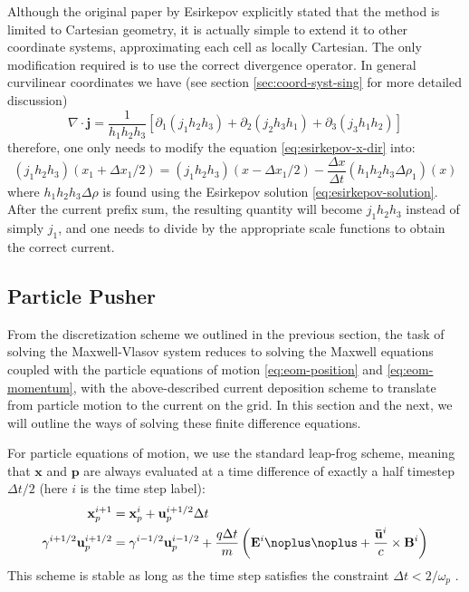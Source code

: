 Although the original paper by Esirkepov explicitly stated that the method is
limited to Cartesian geometry, it is actually simple to extend it to other
coordinate systems, approximating each cell as locally Cartesian. The only
modification required is to use the correct divergence operator. In general
curvilinear coordinates we have (see section \ref{sec:coord-syst-sing} for more
detailed discussion)
\begin{equation}
  \label{eq:curvilinear-div}
  \nabla\cdot \mathbf{j} = \frac{1}{h_1h_2h_3}\left[ \partial_1(j_1h_2h_3) + \partial_2(j_2h_3h_1) + \partial_3(j_3h_1h_2) \right]
\end{equation}
therefore, one only needs to modify the equation \eqref{eq:esirkepov-x-dir}
into:
\begin{equation}
  \label{eq:esirkepov-single-dir}
  (j_1h_2h_3)(x_1 + \Delta x_1/2) = (j_1h_2h_3)(x - \Delta x_1/2) - \frac{\Delta x}{\Delta t}(h_1h_2h_3\Delta \rho_{1})(x)
\end{equation}
where $h_1h_2h_3\Delta \rho$ is found using the Esirkepov solution
\eqref{eq:esirkepov-solution}. After the current prefix sum, the resulting
quantity will become $j_1h_2h_3$ instead of simply $j_{1}$, and one needs to
divide by the appropriate scale functions to obtain the correct current.




\subsection{Particle Pusher}
\label{sec:ptc-pusher}

From the discretization scheme we outlined in the previous section, the task of
solving the Maxwell-Vlasov system reduces to solving the Maxwell equations
coupled with the particle equations of motion \eqref{eq:eom-position} and
\eqref{eq:eom-momentum}, with the above-described current deposition scheme to
translate from particle motion to the current on the grid. In this section and
the next, we will outline the ways of solving these finite difference equations.

For particle equations of motion, we use the standard leap-frog scheme, meaning
that $\mathbf{x}$ and $\mathbf{p}$ are always evaluated at a time difference of
exactly a half timestep $\Delta t/2$ (here $i$ is the time step label):
\begin{align}
  \label{eq:leap-frog-ptc-pos}
    \mathbf{x}_{p}^{i+1} &= \mathbf{x}_{p}^{i} +\mathbf{u}_{p}^{i+1/2} \Delta t \\
  \label{eq:leap-frog-ptc-momentum}
    \gamma^{i+1/2} \mathbf{u}_{p}^{i+1/2} &= \gamma^{i-1/2}
    \mathbf{u}_{p}^{i-1/2} + \frac{q \Delta t}{m} \left( \mathbf{E}^{i}
    \noplus \noplus + \frac{\mathbf{\bar{u}}^{i}}{c}
    \times \mathbf{B}^{i} \right)
\end{align}
This scheme is stable as long as the time step satisfies the constraint $\Delta
t < 2/\omega_p$ \citep{tajima_computational_1989}.

